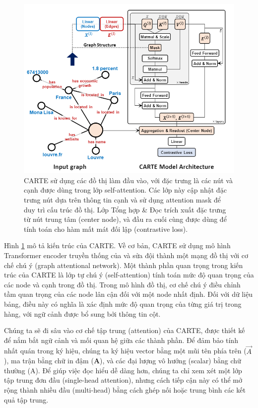 \documentclass{article}
\begin{document}
\begin{figure} 
    \centering
    \includegraphics[scale = 0.8]{carte_architecture.png}
    \caption{CARTE sử dụng các đồ thị làm đầu vào, với đặc trưng là các nút và cạnh được dùng trong lớp self-attention. Các lớp này cập nhật đặc trưng nút dựa trên thông tin cạnh và sử dụng attention mask để duy trì cấu trúc đồ thị. Lớp Tổng hợp \& Đọc trích xuất đặc trưng từ nút trung tâm (center node), và đầu ra cuối cùng được dùng để tính toán cho hàm mất mát đối lập (contrastive loss).}
    \label{fig:carte_architecture}
\end{figure}

Hình \ref{fig:carte_architecture} mô tả kiến trúc của CARTE. Về cơ bản, CARTE sử dụng mô hình Transformer encoder truyền thống của và sửa đội thành một mạng đồ thị với cơ chế chú ý (graph attentional network). Một thành phần quan trọng trong kiến trúc của CARTE là lớp tự chú ý (self-attention) tính toán mức độ quan trọng của các node và cạnh trong đồ thị. Trong mô hình đồ thị, cơ chế chú ý điều chỉnh tầm quan trọng của các node lân cận đối với một node nhất định. Đối với dữ liệu bảng, điều này có nghĩa là xác định mức độ quan trọng của từng giá trị trong hàng, với ngữ cảnh được bổ sung bởi thông tin cột.

Chúng ta sẽ đi sâu vào cơ chế tập trung (attention) của CARTE, được thiết kế để nắm bắt ngữ cảnh và mối quan hệ giữa các thành phần. Để đảm bảo tính nhất quán trong ký hiệu, chúng ta ký hiệu vector bằng một mũi tên phía trên ($\vec{A}$), ma trận bằng chữ in đậm (\textbf{A}), và các đại lượng vô hướng (scalar) bằng chữ thường (A). Để giúp việc đọc hiểu dễ dàng hơn, chúng ta chỉ xem xét một lớp tập trung đơn đầu (single-head attention), nhưng cách tiếp cận này có thể mở rộng thành nhiều đầu (multi-head) bằng cách ghép nối hoặc trung bình các kết quả tập trung.
\end{document}
